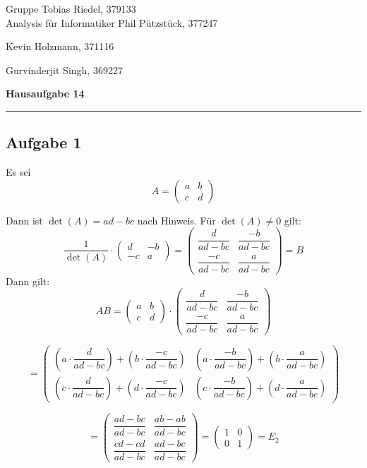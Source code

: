 \documentclass[a4paper,graphics,11pt]{article}
\newcommand{\aufgabe}[1]{\subsection*{Aufgabe #1}}
\begin{document}
\noindent Gruppe              \hfill Tobias Riedel, 379133 \\
\noindent Analysis für Informatiker             \hfill Phil Pützstück, 377247 \\
\strut\hfill Kevin Holzmann, 371116\\
\strut\hfill Gurvinderjit Singh, 369227
\begin{center}
	\LARGE{\textbf{Hausaufgabe 14}}
\end{center}
\begin{center}
\rule[0.1ex]{\textwidth}{1pt}
\end{center}

\aufgabe{1}
Es sei
$$
	A =
		\begin{pmatrix}
			a & b\\
			c & d
		\end{pmatrix}
$$

Dann ist $\det(A) = ad-bc$ nach Hinweis. Für $\det(A) \neq 0$ gilt:
$$
	\frac{1}{\det(A)} \cdot \begin{pmatrix}
		d & -b\\
		-c & a
	\end{pmatrix}
	= \begin{pmatrix}
		\dfrac{d}{ad-bc} & \dfrac{-b}{ad-bc}\\[15pt]
		\dfrac{-c}{ad-bc} & \dfrac{a}{ad-bc}
	\end{pmatrix}
	= B
$$
Dann gilt:
$$
	AB = \begin{pmatrix}
			a & b\\
			c & d
		\end{pmatrix}
	\cdot
	\begin{pmatrix}
		\dfrac{d}{ad-bc} & \dfrac{-b}{ad-bc}\\[15pt]
		\dfrac{-c}{ad-bc} & \dfrac{a}{ad-bc}
	\end{pmatrix}
$$

$$
	= \begin{pmatrix}
		\left(a\cdot\dfrac{d}{ad-bc}\right) + \left(b\cdot \dfrac{-c}{ad-bc}\right)
		& \left(a\cdot\dfrac{-b}{ad-bc}\right) + \left(b\cdot \dfrac{a}{ad-bc}\right) \\[20pt]
		\left(c\cdot\dfrac{d}{ad-bc}\right) + \left(d\cdot \dfrac{-c}{ad-bc}\right)
		& \left(c\cdot\dfrac{-b}{ad-bc}\right) + \left(d\cdot \dfrac{a}{ad-bc}\right)
	\end{pmatrix}
$$

$$
	= \begin{pmatrix}
		\dfrac{ad-bc}{ad-bc} & \dfrac{ab-ab}{ad-bc}\\[15pt]
		\dfrac{cd-cd}{ad-bc} & \dfrac{ad-bc}{ad-bc}
	\end{pmatrix}
	= \begin{pmatrix}
		1&0\\
		0 & 1
	\end{pmatrix}
	= E_2
$$
\end{document}
